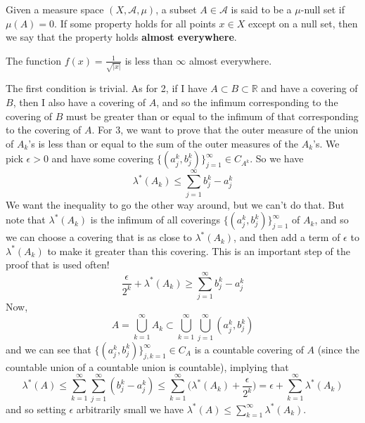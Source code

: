   \begin{definition}
    Given a measure space $(X, \mathcal{A}, \mu)$, a subset $A \in \mathcal{A}$ is said to be a $\mu$-null set if $\mu(A) = 0$. If some property holds for all points $x \in X$ except on a null set, then we say that the property holds \textbf{almost everywhere}.
  \end{definition}

  \begin{example}
    The function $f(x) = \frac{1}{\sqrt{|x|}}$ is less than $\infty$ almost everywhere. 
  \end{example}

  \begin{proposition}
    The first condition is trivial. As for 2, if I have $A \subset B \subset \mathbb{R}$ and have a covering of $B$, then I also have a covering of $A$, and so the infimum corresponding to the covering of $B$ must be greater than or equal to the infimum of that corresponding to the covering of $A$. For 3, we want to prove that the outer measure of the union of $A_k$'s is less than or equal to the sum of the outer measures of the $A_k$'s. We pick $\epsilon > 0$ and have some covering $\{(a^k_j, b^k_j)\}_{j=1}^\infty \in C_{A^k}$. So we have 
    \begin{equation}
      \lambda^*(A_k) \leq \sum_{j=1}^\infty b^k_j - a^k_j
    \end{equation}
    We want the inequality to go the other way around, but we can't do that. But note that $\lambda^* (A_k)$ is the infimum of all coverings $\{(a^k_j, b^k_j)\}_{j=1}^\infty$ of $A_k$, and so we can choose a covering that is as close to $\lambda^* (A_k)$, and then add a term of $\epsilon$ to $\lambda^*(A_k)$ to make it greater than this covering. This is an important step of the proof that is used often! 
    \begin{equation}
      \frac{\epsilon}{2^k} + \lambda^* (A_k) \geq \sum_{j=1}^\infty b_j^k - a_j^k 
    \end{equation}
    Now, 
    \begin{equation}
      A = \bigcup_{k=1}^\infty A_k \subset \bigcup_{k=1}^\infty \bigcup_{j=1}^\infty (a_j^k, b_j^k)
    \end{equation}
    and we can see that $\{(a_j^k , b_j^k)\}_{j, k=1}^\infty \in C_A$ is a countable covering of $A$ (since the countable union of a countable union is countable), implying that 
    \begin{equation}
      \lambda^* (A) \leq \sum_{k=1}^\infty \sum_{j=1}^\infty (b_j^k - a_j^k) \leq \sum_{k=1}^\infty \bigg( \lambda^* (A_k) + \frac{\epsilon}{2^k} \bigg) = \epsilon + \sum_{k=1}^\infty \lambda^*(A_k)
    \end{equation}
    and so setting $\epsilon$ arbitrarily small we have $\lambda^* (A) \leq \sum_{k=1}^\infty \lambda^* (A_k)$. 
  \end{proposition}

